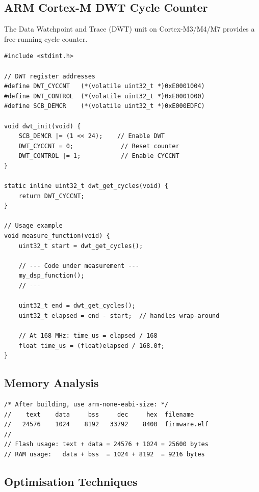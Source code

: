 \subsection{ARM Cortex-M DWT Cycle Counter}

The Data Watchpoint and Trace (DWT) unit on Cortex-M3/M4/M7 provides a free-running cycle counter.

\begin{lstlisting}[style=C, caption={Using the DWT cycle counter for execution time measurement.}]
#include <stdint.h>

// DWT register addresses
#define DWT_CYCCNT   (*(volatile uint32_t *)0xE0001004)
#define DWT_CONTROL  (*(volatile uint32_t *)0xE0001000)
#define SCB_DEMCR    (*(volatile uint32_t *)0xE000EDFC)

void dwt_init(void) {
    SCB_DEMCR |= (1 << 24);    // Enable DWT
    DWT_CYCCNT = 0;             // Reset counter
    DWT_CONTROL |= 1;           // Enable CYCCNT
}

static inline uint32_t dwt_get_cycles(void) {
    return DWT_CYCCNT;
}

// Usage example
void measure_function(void) {
    uint32_t start = dwt_get_cycles();
    
    // --- Code under measurement ---
    my_dsp_function();
    // ---
    
    uint32_t end = dwt_get_cycles();
    uint32_t elapsed = end - start;  // handles wrap-around
    
    // At 168 MHz: time_us = elapsed / 168
    float time_us = (float)elapsed / 168.0f;
}
\end{lstlisting}

\subsection{Memory Analysis}

\begin{lstlisting}[style=C, caption={Checking flash and RAM usage from the linker map file.}]
/* After building, use arm-none-eabi-size: */
//    text    data     bss     dec     hex  filename
//   24576    1024    8192   33792    8400  firmware.elf
//
// Flash usage: text + data = 24576 + 1024 = 25600 bytes
// RAM usage:   data + bss  = 1024 + 8192  = 9216 bytes
\end{lstlisting}

\subsection{Optimisation Techniques}

